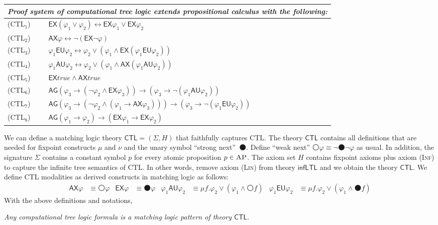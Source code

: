 \documentclass[acmsmall,review,anonymous]{acmart}
\newcommand{\imp}{\to}
\newcommand{\dimp}{\leftrightarrow}
\newcommand{\sig}{\mathbb{\Sigma}}
\newcommand{\MLCTL}{\mathsf{CTL}}
\newcommand{\MLinfLTL}{\mathsf{infLTL}}
\newcommand{\prule}[1]{\textsc{(#1)}}
\newcommand{\AP}{\textsc{AP}}
\newcommand{\true}{\mathit{true}}
\newcommand{\wnext}{{\medcirc}}
\newcommand{\snext}{{\medbullet}}
\newcommand{\AG}{{\mathsf{AG}}}
\newcommand{\AX}{\mathsf{AX}}
\newcommand{\AU}{\mathbin{\mathsf{AU}}}
\newcommand{\EU}{\mathbin{\mathsf{EU}}}
\newcommand{\EX}{\mathsf{EX}}
\newcommand{\Inf}{\prule{Inf}\xspace}
\newcommand{\Lin}{\prule{Lin}\xspace}
\begin{document}
\begin{center}
\begin{tabular}{lm{8cm}}
\multicolumn{2}{l}{
\em
Proof system of computational tree logic extends
propositional calculus with the following:
}
\\\hline
\prule{CTL$_1$}
&
$\EX(\varphi_1 \vee \varphi_2) \dimp \EX \varphi_1 \vee \EX \varphi_2$
\\
\prule{CTL$_2$}
&
$\AX \varphi \dimp \neg (\EX \neg \varphi)$
\\
\prule{CTL$_3$}
&
$\varphi_1 \EU \varphi_2 \dimp 
\varphi_2 \vee (\varphi_1 \wedge \EX (\varphi_1 \EU \varphi_2) )$
\\
\prule{CTL$_4$}
&
$\varphi_1 \AU \varphi_2 \dimp 
\varphi_2 \vee (\varphi_1 \wedge \AX (\varphi_1 \AU \varphi_2) )$
\\
\prule{CTL$_5$}
&
$\EX \true \wedge \AX \true$
\\
\prule{CTL$_6$}
&
$\AG(\varphi_3 \imp (\neg \varphi_2 \wedge \EX \varphi_3))
\imp (\varphi_3 \imp \neg (\varphi_1 \AU \varphi_2))$
\\
\prule{CTL$_7$}
&
$\AG(\varphi_3 \imp (\neg \varphi_2 \wedge (\varphi_1 \imp \AX \varphi_3)))
\imp (\varphi_3 \imp \neg (\varphi_1 \EU \varphi_2))$
\\
\prule{CTL$_8$}
&
$\AG(\varphi_1 \imp \varphi_2)
\imp (\EX \varphi_1 \imp \EX \varphi_2)$
\\
\end{tabular}
\end{center}

We can define a matching logic theory $\MLCTL = (\sig, H)$
that faithfully captures CTL.
The theory $\MLCTL$ contains all definitions that are needed for fixpoint constructs
$\mu$ and $\nu$
and the unary symbol ``strong next''~$\snext$.
Define ``weak next'' $\wnext \varphi \equiv \neg \snext \neg \varphi$ as usual.
In addition,  the signature $\sig$ contains a constant symbol $p$
for every atomic proposition $p \in \AP$.
The axiom set $H$ contains fixpoint axioms plus axiom \Inf to capture
the infinite tree semantics of CTL.
In other words, remove axiom \Lin from theory $\MLinfLTL$ and we obtain the theory $\MLCTL$.
We define CTL modalities as derived constructs in matching logic as follows:
\begin{align*}
\AX \varphi &\equiv \wnext \varphi
&
\EX \varphi &\equiv \snext \varphi
&
\varphi_1 \AU \varphi_2 &\equiv 
\mu f . \varphi_2 \vee (\varphi_1 \wedge \wnext f)
&
\varphi_1 \EU \varphi_2 &\equiv 
\mu f . \varphi_2 \vee (\varphi_1 \wedge \snext f)
\end{align*}
With the above definitions and notations,
\begin{center}
\emph{Any computational tree logic formula is a matching logic pattern of theory $\MLCTL$}.
\end{center}
\end{document}
